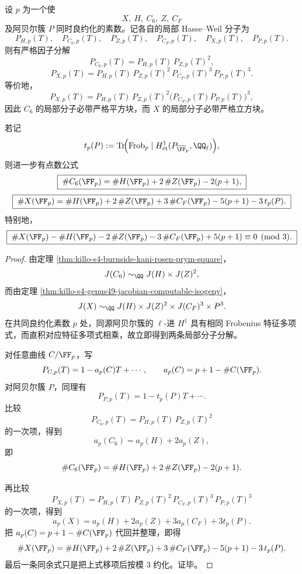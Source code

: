 \begin{conclusion}\label{con:xi-time-part9n-s4-local-euler-square-cube}
设 \(p\) 为一个使
\[
X,\ H,\ C_6,\ Z,\ C_F
\]
及阿贝尔簇 \(P\) 同时良约化的素数。记各自的局部 Hasse--Weil 分子为
\[
P_{H,p}(T),\quad P_{C_6,p}(T),\quad P_{Z,p}(T),\quad
P_{C_F,p}(T),\quad P_{X,p}(T),\quad P_{P,p}(T).
\]
则有严格因子分解
\[
\boxed{\;
P_{C_6,p}(T)=P_{H,p}(T)\,P_{Z,p}(T)^2,
\;}
\]
\[
\boxed{\;
P_{X,p}(T)=P_{H,p}(T)\,P_{Z,p}(T)^2\,P_{C_F,p}(T)^3\,P_{P,p}(T)^3.
\;}
\]
等价地，
\[
P_{X,p}(T)=P_{H,p}(T)\,P_{Z,p}(T)^2
\bigl(P_{C_F,p}(T)P_{P,p}(T)\bigr)^3,
\]
因此 \(C_6\) 的局部分子必带严格平方块，而 \(X\) 的局部分子必带严格立方块。

若记
\[
t_p(P):=
\operatorname{Tr}\!\Bigl(
\mathrm{Frob}_p\mid H^1_{\text{ét}}(P_{\overline{\FF}_p},\QQ_\ell)
\Bigr),
\]
则进一步有点数公式
\[
\boxed{\;
\#C_6(\FF_p)=\#H(\FF_p)+2\,\#Z(\FF_p)-2(p+1),
\;}
\]
\[
\boxed{\;
\#X(\FF_p)=\#H(\FF_p)+2\,\#Z(\FF_p)+3\,\#C_F(\FF_p)-5(p+1)-3\,t_p(P).
\;}
\]
特别地，
\[
\boxed{\;
\#X(\FF_p)-\#H(\FF_p)-2\,\#Z(\FF_p)-3\,\#C_F(\FF_p)+5(p+1)\equiv 0\pmod 3.
\;}
\]
\end{conclusion}
\begin{proof}
由定理 \ref{thm:killo-s4-burnside-kani-rosen-prym-square}，
\[
J(C_6)\sim_{\QQ}J(H)\times J(Z)^2,
\]
而由定理 \ref{thm:killo-s4-genus49-jacobian-computable-isogeny}，
\[
J(X)\sim_{\QQ}J(H)\times J(Z)^2\times J(C_F)^3\times P^3.
\]
在共同良约化素数 \(p\) 处，同源阿贝尔簇的 \(\ell\)-进 \(H^1\) 具有相同 Frobenius 特征多项式，而直积对应特征多项式相乘，故立即得到两条局部分子分解。

对任意曲线 \(C/\FF_p\)，写
\[
P_{C,p}(T)=1-a_p(C)T+\cdots,\qquad a_p(C)=p+1-\#C(\FF_p).
\]
对阿贝尔簇 \(P\)，同理有
\[
P_{P,p}(T)=1-t_p(P)T+\cdots.
\]
比较
\[
P_{C_6,p}(T)=P_{H,p}(T)\,P_{Z,p}(T)^2
\]
的一次项，得到
\[
a_p(C_6)=a_p(H)+2a_p(Z),
\]
即
\[
\#C_6(\FF_p)=\#H(\FF_p)+2\,\#Z(\FF_p)-2(p+1).
\]

再比较
\[
P_{X,p}(T)=P_{H,p}(T)\,P_{Z,p}(T)^2\,P_{C_F,p}(T)^3\,P_{P,p}(T)^3
\]
的一次项，得到
\[
a_p(X)=a_p(H)+2a_p(Z)+3a_p(C_F)+3t_p(P).
\]
把 \(a_p(C)=p+1-\#C(\FF_p)\) 代回并整理，即得
\[
\#X(\FF_p)=\#H(\FF_p)+2\,\#Z(\FF_p)+3\,\#C_F(\FF_p)-5(p+1)-3\,t_p(P).
\]
最后一条同余式只是把上式移项后按模 \(3\) 约化。证毕。
\end{proof}

